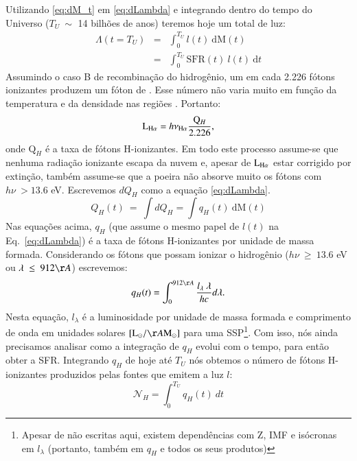 Utilizando \eqref{eq:dM_t} em \eqref{eq:dLambda} e integrando dentro do tempo do Universo ($T_U\
\sim$ 14 bilhões de anos) teremos hoje um total de luz:
\begin{eqnarray}
	\Lambda(t = T_U) &=& \int_0^{T_U} l(t)\ \textrm{d}\textrm{M}(t) \\
	&=& \int_0^{T_U} \mathrm{SFR}(t)\ l(t)\ \textrm{d}t
	\label{eq:Lambda}
\end{eqnarray}
\noindent Assumindo o caso B de recombinação do hidrogênio, um em cada 2.226 fótons
ionizantes produzem um fóton de \Halpha \citep{Osterbrock.Ferland.2006a}. Esse número não varia
muito em função da temperatura e da densidade nas regiões \Hii. Portanto:
\begin{equation}
	\LHalpha = h \nu_{\Halpha} \frac{\mathrm{Q}_H}{2.226},
	\label{eq:LHa_recomb_theory}
\end{equation}
\noindent onde $\mathrm{Q}_H$ é a taxa de fótons H-ionizantes. Em todo este processo assume-se que
nenhuma radiação ionizante escapa da nuvem e, apesar de $\LHalpha$ estar corrigido por
extinção, também assume-se que a poeira não absorve muito os fótons com $h\nu\ > 13.6$ eV.
Escrevemos $dQ_H$ como a equação \eqref{eq:dLambda}.
\begin{equation}
	Q_H(t)\ =\ \int dQ_H = \int q_H(t)\ \mathrm{d}\mathrm{M}(t) 
	\label{eq:QH_t}
\end{equation}
\noindent Nas equações acima, $q_H$ (que assume o mesmo papel de $l(t)$ na Eq.\ \ref{eq:dLambda}) é
a taxa de fótons H-ionizantes por unidade de massa formada. Considerando os fótons que possam ionizar
o hidrogênio ($h\nu\ \geq\ 13.6$ eV ou $\lambda\ \leq\ 912\AA$) escrevemos:
\begin{equation}
	q_H(t) = \int_0^{912\AA} \frac{l_\lambda\ \lambda}{h c} d\lambda.
	\label{eq:qH}
\end{equation}
\noindent Nesta equação, $l_\lambda$ é a luminosidade por unidade de massa formada e comprimento de
onda em unidades solares $[\textrm{L}_\odot/\AA\textrm{M}_\odot]$ para uma SSP\footnote{Apesar de
não escritas aqui, existem dependências com Z, IMF e isócronas em $l_\lambda$ (portanto, também em
$q_H$ e todos os seus produtos)}. Com isso, nós ainda precisamos analisar como a integração de
$q_H$ evolui com o tempo, para então obter a SFR. Integrando $q_H$ de hoje até $T_U$ nós
obtemos o número de fótons H-ionizantes produzidos pelas fontes que emitem a luz $l$:
\begin{equation}
	\mathcal{N}_H = \int_0^{T_U} q_H(t)\ dt
	\label{eq:Nh}
\end{equation}

